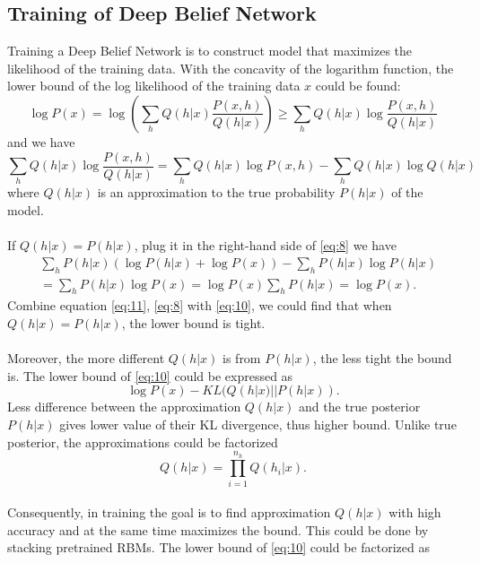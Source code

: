 \documentclass[12pt]{article}
\begin{document}
\subsection{Training of Deep Belief Network}
Training a Deep Belief Network is to construct model that maximizes the likelihood of the training data. With the concavity of the logarithm function, the lower bound of the log likelihood of the training data $x$ could be found:\begin{equation}\label{eq:10}
\log P(x)=\log\left(\sum_h Q(h|x)\frac{P(x,h)}{Q(h|x)}\right)\geq \sum_h Q(h|x)\log\frac{P(x,h)}{Q(h|x)}
\end{equation}
and we have
\begin{equation}\label{eq:8}
\sum_h Q(h|x)\log\frac{P(x,h)}{Q(h|x)}= \sum_h Q(h|x)\log P(x, h)-\sum_h Q(h|x)\log Q(h|x)
\end{equation}
where $Q(h|x)$ is an approximation to the true probability $P(h|x)$ of the model.\\
\\
If $Q(h|x) = P(h|x)$, plug it in the right-hand side of \eqref{eq:8} we have \begin{equation}\label{eq:11}
\begin{split}
&\sum_h P(h|x)(\log P(h|x) + \log P(x))-\sum_h P(h|x)\log P(h|x)\\
& = \sum_h P(h|x)\log P(x) =\log P(x)\sum_h P(h|x) =\log P(x).
\end{split}
\end{equation}
Combine equation \eqref{eq:11}, \eqref{eq:8}  with \eqref{eq:10}, we could find that when $Q(h|x) = P(h|x)$, the lower bound is tight.\\
\\
Moreover, the more different $Q(h|x)$ is from $P(h|x)$, the less tight the bound is. The lower bound of \eqref{eq:10} could be expressed as \begin{equation}
\log P(x) - KL(Q(h|x)||P(h|x)).
\end{equation}
Less difference between the approximation $Q(h|x)$ and the true posterior $P(h|x)$ gives lower value of their KL divergence, thus higher bound. Unlike true posterior, the approximations could be factorized\begin{equation}
Q(h|x)=\prod_{i=1}^{n_h} Q(h_i|x).
\end{equation}
\\
Consequently, in training the goal is to find approximation $Q(h|x)$ with high accuracy   and at the same time maximizes the bound. This could be done by stacking pretrained RBMs. The lower bound of \eqref{eq:10} could be factorized as
\end{document}

